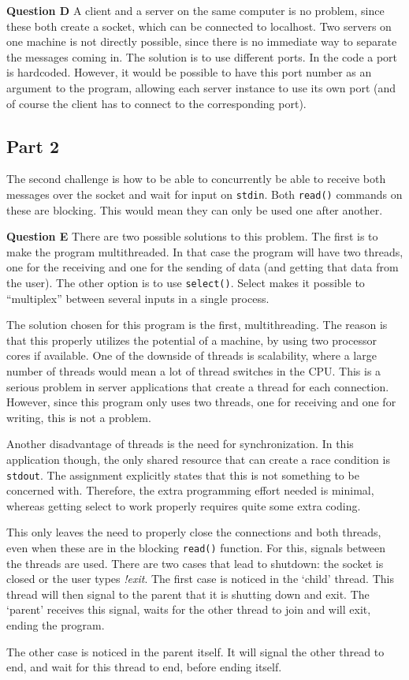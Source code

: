 \documentclass[a4paper]{article}
\begin{document}
\textbf{Question D} A client and a server on the same computer is no problem, since these
both create a socket, which can be connected to localhost. Two servers on one machine is
not directly possible, since there is no immediate way to separate the messages coming in.
The solution is to use different ports. In the code a port is hardcoded. However, it would
be possible to have this port number as an argument to the program, allowing each server
instance to use its own port (and of course the client has to connect to the corresponding
port).

\subsection{Part 2}

The second challenge is how to be able to concurrently be able to receive both messages
over the socket and wait for input on \texttt{stdin}. Both \texttt{read()} commands on
these are blocking. This would mean they can only be used one after another.

\textbf{Question E} There are two possible solutions to this problem. The first is to make
the program multithreaded. In that case the program will have two threads, one for the
receiving and one for the sending of data (and getting that data from the user). The other
option is to use \texttt{select()}. Select makes it possible to ``multiplex'' between
several inputs in a single process.

The solution chosen for this program is the first, multithreading. The reason is that this
properly utilizes the potential of a machine, by using two processor cores if available.
One of the downside of threads is scalability, where a large number of threads would mean
a lot of thread switches in the CPU. This is a serious problem in server applications that
create a thread for each connection. However, since this program only uses two threads, 
one for receiving and one for writing, this is not a problem.

Another disadvantage of threads is the need for synchronization. In this application 
though, the only shared resource that can create a race condition is \texttt{stdout}. The
assignment explicitly states that this is not something to be concerned with. Therefore, 
the extra programming effort needed is minimal, whereas getting select to work properly
requires quite some extra coding.

This only leaves the need to properly close the connections and both threads, even when
these are in the blocking \texttt{read()} function. For this, signals between the threads
are used. There are two cases that lead to shutdown: the socket is closed or the user 
types \emph{!exit}. The first case is noticed in the `child' thread. This thread will then
signal to the parent that it is shutting down and exit. The `parent' receives this signal,
waits for the other thread to join and will exit, ending the program.

The other case is noticed in the parent itself. It will signal the other thread to end, 
and wait for this thread to end, before ending itself.
\end{document}
